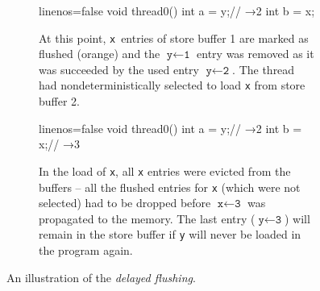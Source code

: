 \begin{figure}[tp]
\begin{subfigure}[t]{0.3\textwidth}
\begin{cppcode*}{linenos=false}
  void thread0() {
    int a = y;// →2
    int b = x;
  }
\end{cppcode*}
\vspace{-\medskipamount}
\caption{At this point, \texttt{x}~entries of store buffer 1 are marked as flushed (\textcolor{flushed}{orange}) and the \mbox{$\texttt{y} \leftarrow \texttt{1}$} entry was removed as it was succeeded by the used entry \mbox{$\texttt{y} \leftarrow \texttt{2}$}.
The thread had nondeterministically selected to load \texttt{x} from store buffer 2.
}\label{fig:mm:flushflagB}

\end{subfigure}
%
\hfill
%
\begin{subfigure}[t]{0.3\textwidth}
\begin{cppcode*}{linenos=false}
  void thread0() {
    int a = y;// →2
    int b = x;// →3
  }
\end{cppcode*}
\vspace{-\medskipamount}
\caption{
In the load of \texttt{x}, all \texttt{x} entries were evicted from the buffers -- all the flushed entries for \texttt{x} (which were not selected) had to be dropped before \mbox{$\texttt{x} \leftarrow \texttt{3}$} was propagated to the memory.
The last entry (\mbox{$\texttt{y} \leftarrow \texttt{3}$}) will remain in the store buffer if \texttt{y} will never be loaded in the program again.
}\label{fig:mm:flushflagC}

\end{subfigure}
\caption{An illustration of the \emph{delayed flushing}.}\label{fig:mm:flushflag}
\end{figure}

